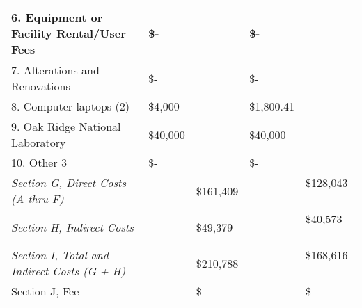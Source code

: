 \documentclass[12pt]{article}
\begin{document}
\begin{table}
\begin{center}
\begin{tabular}{ | l | l | l | l | l | }
	6.  Equipment or Facility Rental/User Fees &  \$-   & \  &  \$-     & \  \\ \hline
	7.  Alterations and Renovations &  \$-  & \  &  \$-      & \  \\ \hline
	8.  Computer laptops (2) & \$4,000  & & \$1,800.41  & \  \\ \hline
	9. Oak Ridge National Laboratory &  \$40,000 &  &  \$40,000    & \  \\ \hline
	10. Other 3 &  \$-    & \ &  \$-      & \  \\ \hline
	\textit{Section G, Direct Costs (A thru F)} &  & \$161,409 & & \$128,043  \  \\ \hline
	\textit{Section H, Indirect Costs} &  & \$49,379 & & \$40,573 \  \\ \hline
	\textit{Section I, Total and Indirect Costs (G + H)} & &  \$210,788 &  &  \$168,616 \  \\ \hline
	Section J, Fee & \ &  \$-   & \ &  \$-       \\ \hline
\end{tabular}
\label{tab:costs}
\end{center}
\end{table}
\end{document}
